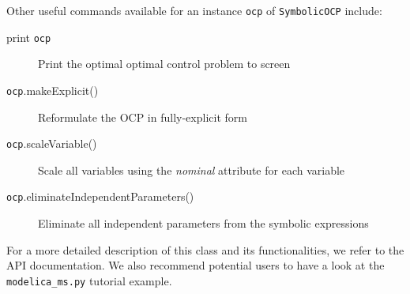 \documentclass[a4paper,12pt]{book}
\begin{document}
Other useful commands available for an instance \texttt{ocp} of \texttt{SymbolicOCP} include:
\begin{description}
\item[print \texttt{ocp}] Print the optimal optimal control problem to screen
\item[\texttt{ocp}.makeExplicit()] Reformulate the OCP in fully-explicit form
\item[\texttt{ocp}.scaleVariable()] Scale all variables using the \emph{nominal} attribute for each variable
\item[\texttt{ocp}.eliminateIndependentParameters()] Eliminate all independent parameters from the symbolic expressions
\end{description}

For a more detailed description of this class and its functionalities, we refer to the API documentation. We also recommend potential users to have a look at the {\texttt{modelica\_ms.py}} tutorial example.
\end{document}
